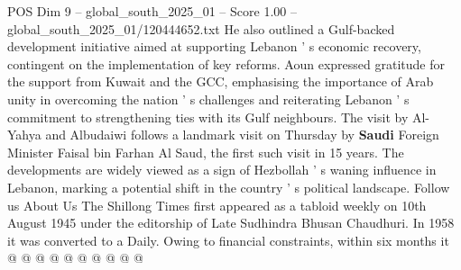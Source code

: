 \begin{textsample}{POS Dim 9 – global\_south\_2025\_01 – Score 1.00 – global\_south\_2025\_01/120444652.txt}
He also outlined a Gulf-backed development initiative aimed at supporting Lebanon ' s economic recovery, contingent on the implementation of key reforms.
Aoun expressed gratitude for the support from Kuwait and the GCC, emphasising the importance of Arab unity in overcoming the nation ' s challenges and reiterating Lebanon ' s commitment to strengthening ties with its Gulf neighbours.
The visit by Al-Yahya and Albudaiwi follows a landmark visit on Thursday by \textbf{Saudi} Foreign Minister Faisal bin Farhan Al Saud, the first such visit in 15 years.
The developments are widely viewed as a sign of Hezbollah ' s waning influence in Lebanon, marking a potential shift in the country ' s political landscape.
Follow us About Us The Shillong Times first appeared as a tabloid weekly on 10th August 1945 under the editorship of Late Sudhindra Bhusan Chaudhuri.
In 1958 it was converted to a Daily.
Owing to financial constraints, within six months it @ @ @ @ @ @ @ @ @ @

\end{textsample}
